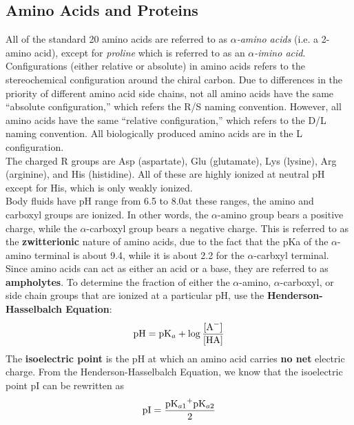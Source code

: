 \documentclass{article}
\theoremstyle{plain}%
\theoremstyle{definition}
\theoremstyle{remark}
\begin{document}
\subsection{Amino Acids and Proteins}
All of the standard 20 amino acids are referred to as \textit{$\alpha$-amino acids} (i.e. a 2-amino acid), except for \textit{proline} which is referred to as an \textit{$\alpha$-imino acid}. Configurations (either relative or absolute) in amino acids refers to the stereochemical configuration around the chiral carbon. Due to differences in the priority of different amino acid side chains, not all amino acids have the same ``absolute configuration,'' which refers the R/S naming convention. However, all amino acids have the same ``relative configuration,'' which refers to the D/L naming convention. All biologically produced amino acids are in the L configuration. \\ 
\indent The charged R groups are Asp (aspartate), Glu (glutamate), Lys (lysine), Arg (arginine), and His (histidine). All of these are highly ionized at neutral pH except for His, which is only weakly ionized.\\
\indent Body fluids have pH range from 6.5 to 8.0\textemdash at these ranges, the amino and carboxyl groups are ionized. In other words, the $\alpha$-amino group bears a positive charge, while the $\alpha$-carboxyl group bears a negative charge. This is referred to as the \textbf{zwitterionic} nature of amino acids, due to the fact that the pKa of the $\alpha$-amino terminal is about 9.4, while it is about 2.2 for the $\alpha$-carbxyl terminal. Since amino acids can act as either an acid or a base, they are referred to as \textbf{ampholytes}. To determine the fraction of either the $\alpha$-amino, $\alpha$-carboxyl, or side chain groups that are ionized at a particular pH, use the \textbf{Henderson-Hasselbalch Equation}:
\begin{equation}
\begin{split}
\ce{pH}=\ce{pK_a}+\log\frac{\ce{[A^-]}}{\ce{[HA]}}
\end{split}
\end{equation}
\noindent The \textbf{isoelectric point} is the pH at which an amino acid carries \textbf{no net} electric charge. From the Henderson-Hasselbalch Equation, we know that the isoelectric point pI can be rewritten as
\begin{equation}
\begin{split}
\ce{pI}=\frac{\ce{pK_{a1}+pK_{a2}}}{2}
\end{split}
\end{equation}
\end{document}
